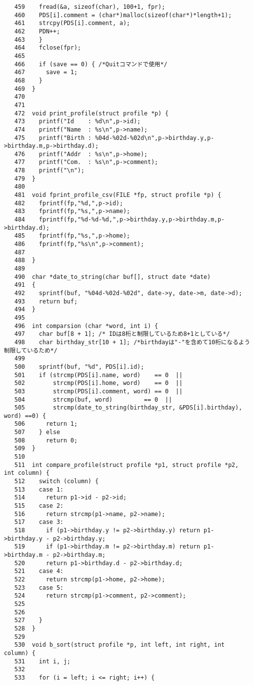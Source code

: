 \documentclass[a4paper,11pt]{jarticle}
\begin{document}
{\begin{verbatim}
   459    fread(&a, sizeof(char), 100+1, fpr);
   460    PDS[i].comment = (char*)malloc(sizeof(char*)*length+1);
   461    strcpy(PDS[i].comment, a);
   462    PDN++;
   463    }
   464    fclose(fpr);
   465    
   466    if (save == 0) { /*Quitコマンドで使用*/
   467      save = 1;
   468    }
   469  }
   470  
   471  
   472  void print_profile(struct profile *p) {
   473    printf("Id    : %d\n",p->id);
   474    printf("Name  : %s\n",p->name);
   475    printf("Birth : %04d-%02d-%02d\n",p->birthday.y,p->birthday.m,p->birthday.d);
   476    printf("Addr  : %s\n",p->home);
   477    printf("Com.  : %s\n",p->comment);
   478    printf("\n");
   479  }
   480  
   481  void fprint_profile_csv(FILE *fp, struct profile *p) {
   482    fprintf(fp,"%d,",p->id);
   483    fprintf(fp,"%s,",p->name);
   484    fprintf(fp,"%d-%d-%d,",p->birthday.y,p->birthday.m,p->birthday.d);
   485    fprintf(fp,"%s,",p->home);
   486    fprintf(fp,"%s\n",p->comment);
   487      
   488  }
   489  
   490  char *date_to_string(char buf[], struct date *date)
   491  {
   492    sprintf(buf, "%04d-%02d-%02d", date->y, date->m, date->d);
   493    return buf;
   494  }
   495  
   496  int comparsion (char *word, int i) {
   497    char buf[8 + 1]; /* IDは8桁と制限しているため8+1としている*/
   498    char birthday_str[10 + 1]; /*birthdayは"-"を含めて10桁になるよう制限しているため*/
   499    
   500    sprintf(buf, "%d", PDS[i].id);
   501    if (strcmp(PDS[i].name, word)    == 0  ||
   502        strcmp(PDS[i].home, word)    == 0  ||
   503        strcmp(PDS[i].comment, word) == 0  ||
   504        strcmp(buf, word)         == 0  ||
   505        strcmp(date_to_string(birthday_str, &PDS[i].birthday), word) ==0) {
   506      return 1;
   507    } else 
   508      return 0;
   509  }
   510  
   511  int compare_profile(struct profile *p1, struct profile *p2, int column) {
   512    switch (column) {
   513    case 1:
   514      return p1->id - p2->id;
   515    case 2:
   516      return strcmp(p1->name, p2->name);
   517    case 3:
   518      if (p1->birthday.y != p2->birthday.y) return p1->birthday.y - p2->birthday.y;
   519      if (p1->birthday.m != p2->birthday.m) return p1->birthday.m - p2->birthday.m;
   520      return p1->birthday.d - p2->birthday.d;
   521    case 4:
   522      return strcmp(p1->home, p2->home);
   523    case 5:
   524      return strcmp(p1->comment, p2->comment);
   525    
   526      
   527    }
   528  }
   529  
   530  void b_sort(struct profile *p, int left, int right, int column) {
   531    int i, j;
   532  
   533    for (i = left; i <= right; i++) {

\end{verbatim}}
\end{document}
